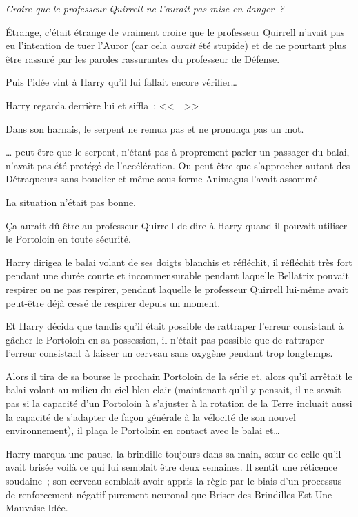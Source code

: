 \emph{Croire que le professeur Quirrell ne l'aurait pas mise en danger~?}

Étrange, c'était étrange de vraiment croire que le professeur Quirrell n'avait pas eu l'intention de tuer l'Auror (car cela \emph{aurait} été stupide) et de ne pourtant plus être rassuré par les paroles rassurantes du professeur de Défense.

Puis l'idée vint à Harry qu'il lui fallait encore vérifier…

Harry regarda derrière lui et siffla~: <<~~>>

Dans son harnais, le serpent ne remua pas et ne prononça pas un mot.

… peut-être que le serpent, n'étant pas à proprement parler un passager du balai, n'avait pas été protégé de l'accélération. Ou peut-être que s'approcher autant des Détraqueurs sans bouclier et même sous forme Animagus l'avait assommé.

La situation n'était pas bonne.

Ça aurait dû être au professeur Quirrell de dire à Harry quand il pouvait utiliser le Portoloin en toute sécurité.

Harry dirigea le balai volant de ses doigts blanchis et réfléchit, il réfléchit très fort pendant une durée courte et incommensurable pendant laquelle Bellatrix pouvait respirer ou ne pas respirer, pendant laquelle le professeur Quirrell lui-même avait peut-être déjà cessé de respirer depuis un moment.

Et Harry décida que tandis qu'il était possible de rattraper l'erreur consistant à gâcher le Portoloin en sa possession, il n'était pas possible que de rattraper l'erreur consistant à laisser un cerveau sans oxygène pendant trop longtemps.

Alors il tira de sa bourse le prochain Portoloin de la série et, alors qu'il arrêtait le balai volant au milieu du ciel bleu clair (maintenant qu'il y pensait, il ne savait pas si la capacité d'un Portoloin à s'ajuster à la rotation de la Terre incluait aussi la capacité de s'adapter de façon générale à la vélocité de son nouvel environnement), il plaça le Portoloin en contact avec le balai et…

Harry marqua une pause, la brindille toujours dans sa main, sœur de celle qu'il avait brisée voilà ce qui lui semblait être deux semaines. Il sentit une réticence soudaine~; son cerveau semblait avoir appris la règle par le biais d'un processus de renforcement négatif purement neuronal que Briser des Brindilles Est Une Mauvaise Idée.

